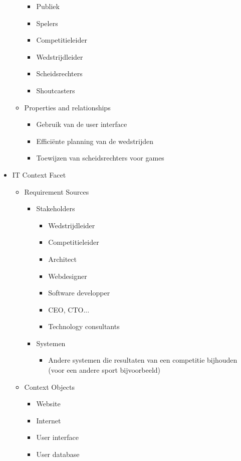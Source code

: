 \documentclass[12pt,a4paper]{article}
\begin{document}
\begin{itemize}
\begin{itemize}
\begin{itemize}
					\item Publiek
					\item Spelers
					\item Competitieleider
					\item Wedstrijdleider
					\item Scheidsrechters
					\item Shoutcasters
				\end{itemize}
				\item Properties and relationships
				\begin{itemize}
					\item Gebruik van de user interface
					\item Efficiënte planning van de wedstrijden
					\item Toewijzen van scheidsrechters voor games
				\end{itemize}
			\end{itemize}
			\item IT Context Facet
			\begin{itemize}
				\item Requirement Sources
				\begin{itemize}
					\item Stakeholders
					\begin{itemize}
						\item Wedstrijdleider
						\item Competitieleider
						\item Architect
						\item Webdesigner
						\item Software developper
						\item CEO, CTO...
						\item Technology consultants
					\end{itemize}
					\item Systemen
					\begin{itemize}
						\item Andere systemen die resultaten van een competitie bijhouden (voor een andere sport bijvoorbeeld)
					\end{itemize}
				\end{itemize}
				\item Context Objects
				\begin{itemize}
					\item Website
					\item Internet
					\item User interface
					\item User database

\end{itemize}
\end{itemize}
\end{itemize}
\end{document}
